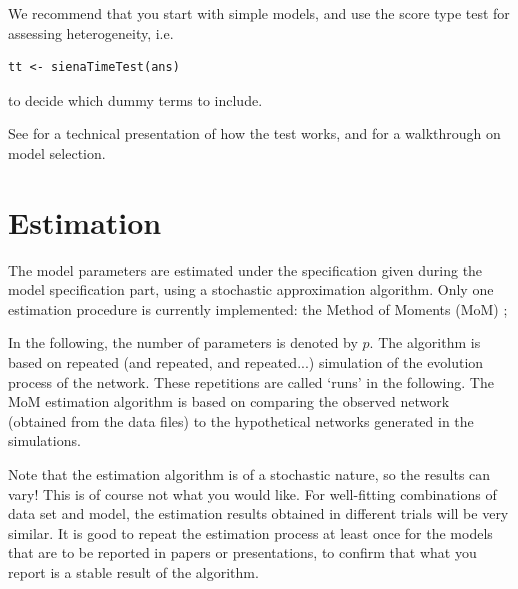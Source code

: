 \documentclass[a4paper,fleqn]{article}
\newcommand{\+}{\, + \,}
\begin{document}
{We recommend that you start with simple models, and use the score type test for
assessing heterogeneity, i.e.
\begin{verbatim}
tt <- sienaTimeTest(ans)
\end{verbatim}
to decide which dummy terms to include.

See \citet{Lospinoso2010a} for a technical presentation of how the test works,
and \citet{Lospinoso2010b} for a walkthrough on model selection.


\begin{print}
\newpage
\end{print}
\section{Estimation}
\label{S_Est}

The model parameters are estimated under the specification given
during the model specification part, using a stochastic
approximation algorithm.
Only one estimation procedure is currently implemented:
the Method of Moments (MoM) \citep*{Snijders01, SnijdersEA07};


In the following, the number of
parameters is denoted by $p$. The algorithm %
is based on repeated
(and repeated, and repeated...) simulation of the evolution
process of the network. These repetitions are called `runs' in the
following. The MoM estimation algorithm is based on comparing the
observed network (obtained from the data files)
to the hypothetical networks generated in the simulations.

Note that the estimation algorithm is of a stochastic nature, so
the results can vary! This is of course not what you would like.
For well-fitting combinations of data set and model, the
estimation results obtained in different trials will be very
similar. It is good to repeat the estimation process at least once
for the models that are to be reported in papers or presentations,
to confirm that what you report is a stable result of the
algorithm.

}
\end{document}

